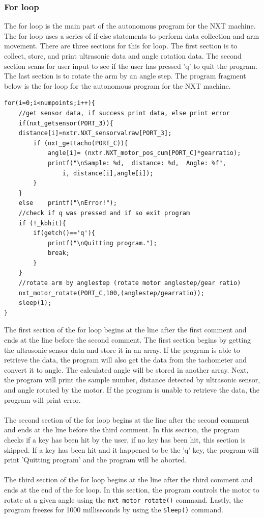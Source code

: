 \documentclass[12pt]{article}
\begin{document}
\subsubsection*{For loop}
The for loop is the main part of the autonomous program for the NXT machine.
The for loop uses a series of if-else statements to perform data collection and arm movement.
There are three sections for this for loop.
The first section is to collect, store, and print ultrasonic data and angle rotation data.
The second section scans for user input to see if the user has pressed 'q' to quit the program.
The last section is to rotate the arm by an angle step.
The program fragment below is the for loop for the autonomous program for the NXT machine.
\begin{verbatim}
for(i=0;i<numpoints;i++){
    //get sensor data, if success print data, else print error
    if(nxt_getsensor(PORT_3)){
    distance[i]=nxtr.NXT_sensorvalraw[PORT_3];
        if (nxt_gettacho(PORT_C)){
            angle[i]= (nxtr.NXT_motor_pos_cum[PORT_C]*gearratio);
            printf("\nSample: %d,  distance: %d,  Angle: %f",
                i, distance[i],angle[i]);
        }
    }
    else	printf("\nError!");
    //check if q was pressed and if so exit program
    if (!_kbhit){
        if(getch()=='q'){
            printf("\nQuitting program.");
            break;
        }
    }		
    //rotate arm by anglestep (rotate motor anglestep/gear ratio)
    nxt_motor_rotate(PORT_C,100,(anglestep/gearratio));
    sleep(1);
}
\end{verbatim}
The first section of the for loop begins at the line after the first comment and ends at the line
    before the second comment.
The first section begins by getting the ultrasonic sensor data and store it in an array.
If the program is able to retrieve the data, the program will also get the data from the tachometer
    and convert it to angle.
The calculated angle will be stored in another array.
Next, the program will print the sample number, distance detected by ultrasonic sensor, and angle
    rotated by the motor.
If the program is unable to retrieve the data, the program will print error.
\\ \\
The second section of the for loop begins at the line after the second comment and ends at the line
    before the third comment.
In this section, the program checks if a key has been hit by the user, if no key has been hit, this
    section is skipped.
If a key has been hit and it happened to be the 'q' key, the program will print 'Quitting program' and
    the program will be aborted.
\\ \\
The third section of the for loop begins at the line after the third comment and ends at the end of
    the for loop.
In this section, the program controls the motor to rotate at a given angle using the 
    \verb+nxt_motor_rotate()+ command.
Lastly, the program freezes for 1000 milliseconds by using the \verb+Sleep()+ command.
\end{document}

